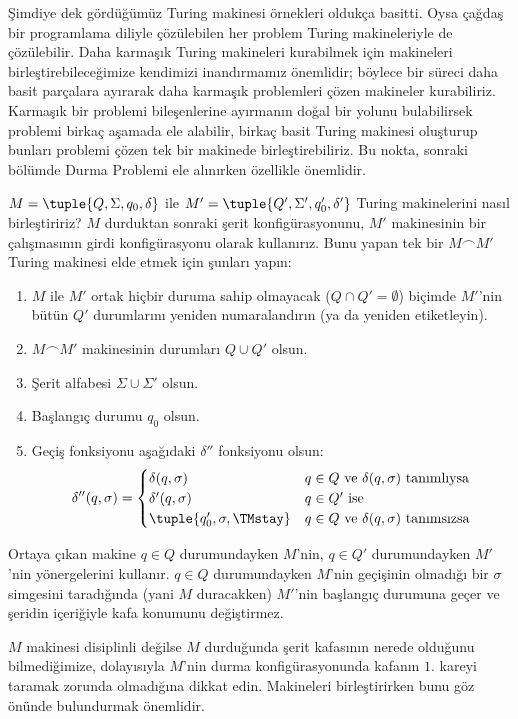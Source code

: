 


\begin{explain}
Şimdiye dek gördüğümüz Turing makinesi örnekleri oldukça basitti. Oysa çağdaş
bir programlama diliyle çözülebilen her problem Turing makineleriyle de
çözülebilir. Daha karmaşık Turing makineleri kurabilmek için makineleri
birleştirebileceğimize kendimizi inandırmamız önemlidir; böylece bir süreci
daha basit parçalara ayırarak daha karmaşık problemleri çözen makineler
kurabiliriz. Karmaşık bir problemi bileşenlerine ayırmanın doğal bir yolunu
bulabilirsek problemi birkaç aşamada ele alabilir, birkaç basit Turing
makinesi oluşturup bunları problemi çözen tek bir makinede birleştirebiliriz.
Bu nokta, sonraki bölümde Durma Problemi ele alınırken özellikle önemlidir.

$M=\tuple{Q,\Sigma,q_0,\delta}$ ile
$M'=\tuple{Q',\Sigma',q_0',\delta'}$ Turing makinelerini nasıl birleştiririz?
$M$ durduktan sonraki şerit konfigürasyonunu, $M'$ makinesinin bir
çalışmasının girdi konfigürasyonu olarak kullanırız. Bunu yapan tek bir
$M\frown M'$ Turing makinesi elde etmek için şunları yapın:
\begin{enumerate}
    \item $M$ ile $M'$ ortak hiçbir duruma sahip olmayacak
    ($Q\cap Q'=\emptyset$) biçimde $M'$'nin bütün $Q'$ durumlarını yeniden
    numaralandırın (ya da yeniden etiketleyin).
    \item $M\frown M'$ makinesinin durumları $Q\cup Q'$ olsun.
    \item Şerit alfabesi $\Sigma\cup\Sigma'$ olsun.
    \item Başlangıç durumu $q_0$ olsun.
    \item Geçiş fonksiyonu aşağıdaki $\delta''$ fonksiyonu olsun:
    \[\delta''(q,\sigma) =
    \begin{cases}
      \delta(q,\sigma) & \text{$q \in Q$ ve $\delta(q,\sigma)$ tanımlıysa}\\
      \delta'(q,\sigma) & \text{$q \in Q'$ ise}\\
      \tuple{q_0', \sigma, \TMstay} & \text{$q \in Q$ ve
      $\delta(q,\sigma)$ tanımsızsa}
    \end{cases}\]
\end{enumerate}
Ortaya çıkan makine $q\in Q$ durumundayken $M$'nin, $q\in Q'$ durumundayken
$M'$'nin yönergelerini kullanır. $q\in Q$ durumundayken $M$'nin geçişinin
olmadığı bir $\sigma$ simgesini taradığında (yani $M$ duracakken) $M'$'nin
başlangıç durumuna geçer ve şeridin içeriğiyle kafa konumunu değiştirmez.

$M$ makinesi disiplinli değilse $M$ durduğunda şerit kafasının nerede
olduğunu bilmediğimize, dolayısıyla $M$'nin durma konfigürasyonunda kafanın
$1$. kareyi taramak zorunda olmadığına dikkat edin. Makineleri birleştirirken
bunu göz önünde bulundurmak önemlidir.
\end{explain}

